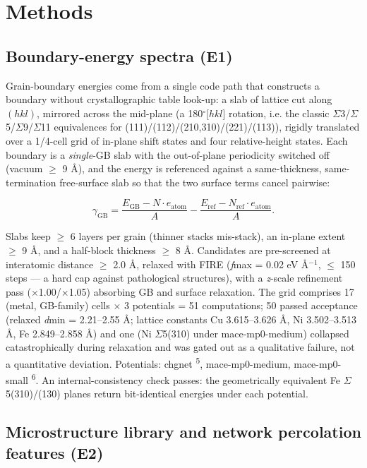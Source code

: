\documentclass[11pt]{article}
\begin{document}
\section{Methods}

\subsection{Boundary-energy spectra (E1)}

Grain-boundary energies come from a single code path that constructs a boundary without crystallographic table look-up: a slab of lattice cut along $(hkl)$, mirrored across the mid-plane (a 180$^\circ$[$hkl$] rotation, i.e. the classic $\Sigma$3/$\Sigma$5/$\Sigma$9/$\Sigma$11 equivalences for (111)/(112)/(210,310)/(221)/(113)), rigidly translated over a 1/4-cell grid of in-plane shift states and four relative-height states. Each boundary is a \textit{single}-GB slab with the out-of-plane periodicity switched off (vacuum $\ge$ 9 \AA), and the energy is referenced against a same-thickness, same-termination free-surface slab so that the two surface terms cancel pairwise:

\[
\gamma_{\mathrm{GB}} = \frac{E_{\mathrm{GB}} - N\cdot e_{\mathrm{atom}}}{A} - \frac{E_{\mathrm{ref}} - N_{\mathrm{ref}}\cdot e_{\mathrm{atom}}}{A}.
\]

Slabs keep $\ge$ 6 layers per grain (thinner stacks mis-stack), an in-plane extent $\ge$ 9 \AA, and a half-block thickness $\ge$ 8 \AA. Candidates are pre-screened at interatomic distance $\ge$ 2.0 \AA, relaxed with FIRE (\textit{f}max = 0.02 eV \AA$^{-1}$, $\le$ 150 steps --- a hard cap against pathological structures), with a \textit{z}-scale refinement pass ($\times$1.00/$\times$1.05) absorbing GB and surface relaxation. The grid comprises 17 (metal, GB-family) cells $\times$ 3 potentials = 51 computations; 50 passed acceptance (relaxed \textit{d}min = 2.21--2.55 \AA; lattice constants Cu 3.615--3.626 \AA, Ni 3.502--3.513 \AA, Fe 2.849--2.858 \AA) and one (Ni $\Sigma$5(310) under mace-mp0-medium) collapsed catastrophically during relaxation and was gated out as a qualitative failure, not a quantitative deviation. Potentials: chgnet \textsuperscript{5}, mace-mp0-medium, mace-mp0-small \textsuperscript{6}. An internal-consistency check passes: the geometrically equivalent Fe $\Sigma$5(310)/(130) planes return bit-identical energies under each potential.

\subsection{Microstructure library and network percolation features (E2)}
\end{document}
